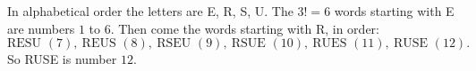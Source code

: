In alphabetical order the letters are E, R, S, U. The $3!=6$ words starting with E are numbers $1$ to $6$. Then come the words starting with R, in order:
\[
\text{RESU }(7),\ \text{REUS }(8),\ \text{RSEU }(9),\ \text{RSUE }(10),\ \text{RUES }(11),\ \text{RUSE }(12).
\]
So RUSE is number $\boxed{12}$.
